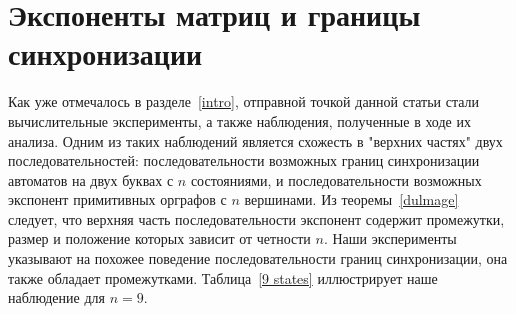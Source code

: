 \documentclass[11pt]{article}
\newcommand{\sa}{synchronizing automata}
\begin{document}
\section{Экспоненты матриц и границы синхронизации}
\label{matrices}

Как уже отмечалось в разделе~\ref{intro}, отправной точкой данной
статьи стали вычислительные эксперименты, а также наблюдения, полученные
в ходе их анализа. Одним из таких наблюдений является схожесть в "верхних
частях" двух последовательностей: последовательности возможных 
границ синхронизации автоматов на двух буквах с $n$ состояниями, и 
последовательности возможных экспонент примитивных орграфов с $n$
вершинами. Из теоремы~\ref{dulmage} следует, что верхняя часть
последовательности экспонент содержит промежутки, размер и положение
которых зависит от четности $n$. Наши эксперименты указывают на похожее
поведение последовательности границ синхронизации, она также обладает
промежутками. Таблица~\ref{9 states} иллюстрирует наше наблюдение для
$n=9$.


\end{document}
